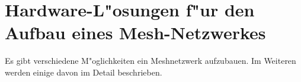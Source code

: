 \section{Hardware-L"osungen f"ur den Aufbau eines Mesh-Netzwerkes}

Es gibt verschiedene M"oglichkeiten ein Meshnetzwerk aufzubauen.
Im Weiteren werden einige davon im Detail beschrieben. 




